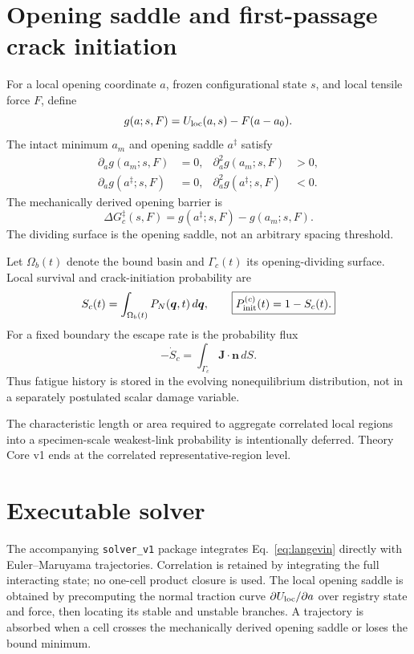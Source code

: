 \documentclass[11pt]{article}
\begin{document}
\section{Opening saddle and first-passage crack initiation}
For a local opening coordinate $a$, frozen configurational state $s$, and local tensile force $F$, define
\begin{equation}
 g(a;s,F)=U_{\rm loc}(a,s)-F(a-a_0).
\end{equation}
The intact minimum $a_m$ and opening saddle $a^\ddagger$ satisfy
\begin{align}
 \partial_a g(a_m;s,F)&=0,
 &\partial_a^2g(a_m;s,F)&>0,\\
 \partial_a g(a^\ddagger;s,F)&=0,
 &\partial_a^2g(a^\ddagger;s,F)&<0.
\end{align}
The mechanically derived opening barrier is
\begin{equation}
 \boxed{
 \Delta G_c^\ddagger(s,F)
 =g(a^\ddagger;s,F)-g(a_m;s,F).
 }
 \label{eq:barrier}
\end{equation}
The dividing surface is the opening saddle, not an arbitrary spacing threshold.

Let $\Omega_b(t)$ denote the bound basin and $\Gamma_c(t)$ its opening-dividing surface. Local survival and crack-initiation probability are
\begin{equation}
 S_c(t)=\int_{\Omega_b(t)}P_N(\bm q,t)\,d\bm q,
 \qquad
 \boxed{P_{\rm init}^{(c)}(t)=1-S_c(t).}
 \label{eq:survival}
\end{equation}
For a fixed boundary the escape rate is the probability flux
\begin{equation}
 -\dot S_c=\int_{\Gamma_c}\bm J\cdot\bm n\,dS.
 \label{eq:flux}
\end{equation}
Thus fatigue history is stored in the evolving nonequilibrium distribution, not in a separately postulated scalar damage variable.

The characteristic length or area required to aggregate correlated local regions into a specimen-scale weakest-link probability is intentionally deferred. Theory Core v1 ends at the correlated representative-region level.

\section{Executable solver}
The accompanying \texttt{solver\_v1} package integrates Eq.~\eqref{eq:langevin} directly with Euler--Maruyama trajectories. Correlation is retained by integrating the full interacting state; no one-cell product closure is used. The local opening saddle is obtained by precomputing the normal traction curve $\partial U_{\rm loc}/\partial a$ over registry state and force, then locating its stable and unstable branches. A trajectory is absorbed when a cell crosses the mechanically derived opening saddle or loses the bound minimum.
\end{document}
